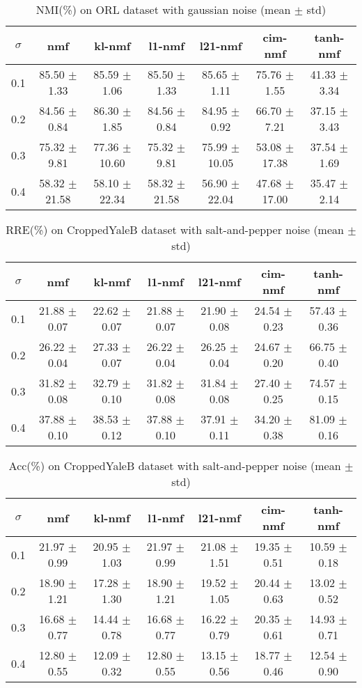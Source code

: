 \documentclass{article} %
\begin{document}
\begin{table}
\begin{tabular}{c|cccccc}$\sigma$ & nmf & kl-nmf & l1-nmf & l21-nmf & cim-nmf & tanh-nmf \\\hline
0.1 & 85.50 $\pm$ 1.33 & 85.59 $\pm$ 1.06 & 85.50 $\pm$ 1.33 & 85.65 $\pm$ 1.11 & 75.76 $\pm$ 1.55 & 41.33 $\pm$ 3.34 \\
0.2 & 84.56 $\pm$ 0.84 & 86.30 $\pm$ 1.85 & 84.56 $\pm$ 0.84 & 84.95 $\pm$ 0.92 & 66.70 $\pm$ 7.21 & 37.15 $\pm$ 3.43 \\
0.3 & 75.32 $\pm$ 9.81 & 77.36 $\pm$ 10.60 & 75.32 $\pm$ 9.81 & 75.99 $\pm$ 10.05 & 53.08 $\pm$ 17.38 & 37.54 $\pm$ 1.69 \\
0.4 & 58.32 $\pm$ 21.58 & 58.10 $\pm$ 22.34 & 58.32 $\pm$ 21.58 & 56.90 $\pm$ 22.04 & 47.68 $\pm$ 17.00 & 35.47 $\pm$ 2.14 \\
\end{tabular}\caption{
  NMI(\%) on ORL dataset with gaussian noise (mean $\pm$ std)
  \label{tab:NMI-ORL-gaussian}
}\end{table}
\begin{table}
\begin{tabular}{c|cccccc}$\sigma$ & nmf & kl-nmf & l1-nmf & l21-nmf & cim-nmf & tanh-nmf \\\hline
0.1 & 21.88 $\pm$ 0.07 & 22.62 $\pm$ 0.07 & 21.88 $\pm$ 0.07 & 21.90 $\pm$ 0.08 & 24.54 $\pm$ 0.23 & 57.43 $\pm$ 0.36 \\
0.2 & 26.22 $\pm$ 0.04 & 27.33 $\pm$ 0.07 & 26.22 $\pm$ 0.04 & 26.25 $\pm$ 0.04 & 24.67 $\pm$ 0.20 & 66.75 $\pm$ 0.40 \\
0.3 & 31.82 $\pm$ 0.08 & 32.79 $\pm$ 0.10 & 31.82 $\pm$ 0.08 & 31.84 $\pm$ 0.08 & 27.40 $\pm$ 0.25 & 74.57 $\pm$ 0.15 \\
0.4 & 37.88 $\pm$ 0.10 & 38.53 $\pm$ 0.12 & 37.88 $\pm$ 0.10 & 37.91 $\pm$ 0.11 & 34.20 $\pm$ 0.38 & 81.09 $\pm$ 0.16 \\
\end{tabular}\caption{
  RRE(\%) on CroppedYaleB dataset with salt-and-pepper noise (mean $\pm$ std)
  \label{tab:RRE-CroppedYaleB-salt-and-pepper}
}\end{table}
\begin{table}
\begin{tabular}{c|cccccc}$\sigma$ & nmf & kl-nmf & l1-nmf & l21-nmf & cim-nmf & tanh-nmf \\\hline
0.1 & 21.97 $\pm$ 0.99 & 20.95 $\pm$ 1.03 & 21.97 $\pm$ 0.99 & 21.08 $\pm$ 1.51 & 19.35 $\pm$ 0.51 & 10.59 $\pm$ 0.18 \\
0.2 & 18.90 $\pm$ 1.21 & 17.28 $\pm$ 1.30 & 18.90 $\pm$ 1.21 & 19.52 $\pm$ 1.05 & 20.44 $\pm$ 0.63 & 13.02 $\pm$ 0.52 \\
0.3 & 16.68 $\pm$ 0.77 & 14.44 $\pm$ 0.78 & 16.68 $\pm$ 0.77 & 16.22 $\pm$ 0.79 & 20.35 $\pm$ 0.61 & 14.93 $\pm$ 0.71 \\
0.4 & 12.80 $\pm$ 0.55 & 12.09 $\pm$ 0.32 & 12.80 $\pm$ 0.55 & 13.15 $\pm$ 0.56 & 18.77 $\pm$ 0.46 & 12.54 $\pm$ 0.90 \\
\end{tabular}\caption{
  Acc(\%) on CroppedYaleB dataset with salt-and-pepper noise (mean $\pm$ std)
  \label{tab:Acc-CroppedYaleB-salt-and-pepper}
}\end{table}
\end{document}
